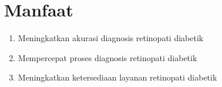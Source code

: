 \section{Manfaat}
\label{sec:Manfaat}

\begin{enumerate}
	\item Meningkatkan akurasi diagnosis retinopati diabetik
	\item Mempercepat proses diagnosis retinopati diabetik
	\item Meningkatkan ketersediaan layanan retinopati diabetik
\end{enumerate}

